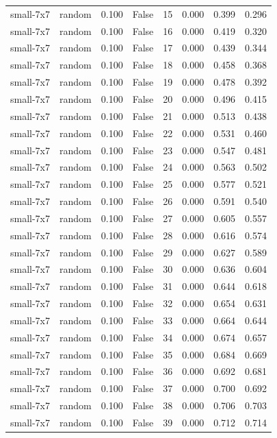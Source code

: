 \begin{tabular}{llrrrrrr}
small-7x7 & random & 0.100 & False & 15 & 0.000 & 0.399 & 0.296 \\
small-7x7 & random & 0.100 & False & 16 & 0.000 & 0.419 & 0.320 \\
small-7x7 & random & 0.100 & False & 17 & 0.000 & 0.439 & 0.344 \\
small-7x7 & random & 0.100 & False & 18 & 0.000 & 0.458 & 0.368 \\
small-7x7 & random & 0.100 & False & 19 & 0.000 & 0.478 & 0.392 \\
small-7x7 & random & 0.100 & False & 20 & 0.000 & 0.496 & 0.415 \\
small-7x7 & random & 0.100 & False & 21 & 0.000 & 0.513 & 0.438 \\
small-7x7 & random & 0.100 & False & 22 & 0.000 & 0.531 & 0.460 \\
small-7x7 & random & 0.100 & False & 23 & 0.000 & 0.547 & 0.481 \\
small-7x7 & random & 0.100 & False & 24 & 0.000 & 0.563 & 0.502 \\
small-7x7 & random & 0.100 & False & 25 & 0.000 & 0.577 & 0.521 \\
small-7x7 & random & 0.100 & False & 26 & 0.000 & 0.591 & 0.540 \\
small-7x7 & random & 0.100 & False & 27 & 0.000 & 0.605 & 0.557 \\
small-7x7 & random & 0.100 & False & 28 & 0.000 & 0.616 & 0.574 \\
small-7x7 & random & 0.100 & False & 29 & 0.000 & 0.627 & 0.589 \\
small-7x7 & random & 0.100 & False & 30 & 0.000 & 0.636 & 0.604 \\
small-7x7 & random & 0.100 & False & 31 & 0.000 & 0.644 & 0.618 \\
small-7x7 & random & 0.100 & False & 32 & 0.000 & 0.654 & 0.631 \\
small-7x7 & random & 0.100 & False & 33 & 0.000 & 0.664 & 0.644 \\
small-7x7 & random & 0.100 & False & 34 & 0.000 & 0.674 & 0.657 \\
small-7x7 & random & 0.100 & False & 35 & 0.000 & 0.684 & 0.669 \\
small-7x7 & random & 0.100 & False & 36 & 0.000 & 0.692 & 0.681 \\
small-7x7 & random & 0.100 & False & 37 & 0.000 & 0.700 & 0.692 \\
small-7x7 & random & 0.100 & False & 38 & 0.000 & 0.706 & 0.703 \\
small-7x7 & random & 0.100 & False & 39 & 0.000 & 0.712 & 0.714 \\

\end{tabular}
